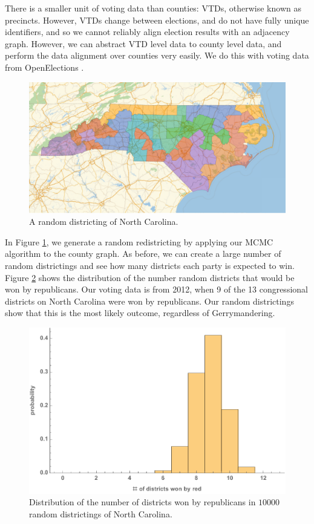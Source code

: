 \documentclass[12pt]{article}
\begin{document}
\par There is a smaller unit of voting data than counties: VTDs, otherwise known as precincts. However, VTDs change between elections, and do not have fully unique identifiers, and so we cannot reliably align election results with an adjacency graph. However, we can abstract VTD level data to county level data, and perform the data alignment over counties very easily. We do this with voting data from OpenElections \cite{openelections}.

    \begin{figure}[h!]
    \centering
    \includegraphics[scale=0.5]{nc_random_districting.pdf}
    \caption{A random districting of North Carolina.}
    \label{fig:nc_random_districting}
    \end{figure}

\par In Figure \ref{fig:nc_random_districting}, we generate a random redistricting by applying our MCMC algorithm to the county graph. As before, we can create a large number of random districtings and see how many districts each party is expected to win. Figure \ref{fig:nc_dist} shows the distribution of the number random districts that would be won by republicans. Our voting data is from 2012, when 9 of the 13 congressional districts on North Carolina were won by republicans. Our random districtings show that this is the most likely outcome, regardless of Gerrymandering.

    \begin{figure}[h!]
    \centering
    \includegraphics[scale=0.7]{nc_dist.pdf}
    \caption{Distribution of the number of districts won by republicans in $10000$ random districtings of North Carolina.}
    \label{fig:nc_dist}
    \end{figure}
\end{document}
